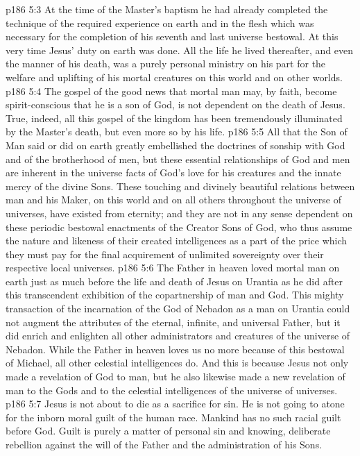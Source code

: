 \vs p186 5:3 At the time of the Master’s baptism he had already completed the technique of the required experience on earth and in the flesh which was necessary for the completion of his seventh and last universe bestowal. At this very time Jesus’ duty on earth was done. All the life he lived thereafter, and even the manner of his death, was a purely personal ministry on his part for the welfare and uplifting of his mortal creatures on this world and on other worlds.
\vs p186 5:4 The gospel of the good news that mortal man may, by faith, become spirit\hyp{}conscious that he is a son of God, is not dependent on the death of Jesus. True, indeed, all this gospel of the kingdom has been tremendously illuminated by the Master’s death, but even more so by his life.
\vs p186 5:5 All that the Son of Man said or did on earth greatly embellished the doctrines of sonship with God and of the brotherhood of men, but these essential relationships of God and men are inherent in the universe facts of God’s love for his creatures and the innate mercy of the divine Sons. These touching and divinely beautiful relations between man and his Maker, on this world and on all others throughout the universe of universes, have existed from eternity; and they are not in any sense dependent on these periodic bestowal enactments of the Creator Sons of God, who thus assume the nature and likeness of their created intelligences as a part of the price which they must pay for the final acquirement of unlimited sovereignty over their respective local universes.
\vs p186 5:6 The Father in heaven loved mortal man on earth just as much before the life and death of Jesus on Urantia as he did after this transcendent exhibition of the copartnership of man and God. This mighty transaction of the incarnation of the God of Nebadon as a man on Urantia could not augment the attributes of the eternal, infinite, and universal Father, but it did enrich and enlighten all other administrators and creatures of the universe of Nebadon. While the Father in heaven loves us no more because of this bestowal of Michael, all other celestial intelligences do. And this is because Jesus not only made a revelation of God to man, but he also likewise made a new revelation of man to the Gods and to the celestial intelligences of the universe of universes.
\vs p186 5:7 Jesus is not about to die as a sacrifice for sin. He is not going to atone for the inborn moral guilt of the human race. Mankind has no such racial guilt before God. Guilt is purely a matter of personal sin and knowing, deliberate rebellion against the will of the Father and the administration of his Sons.
